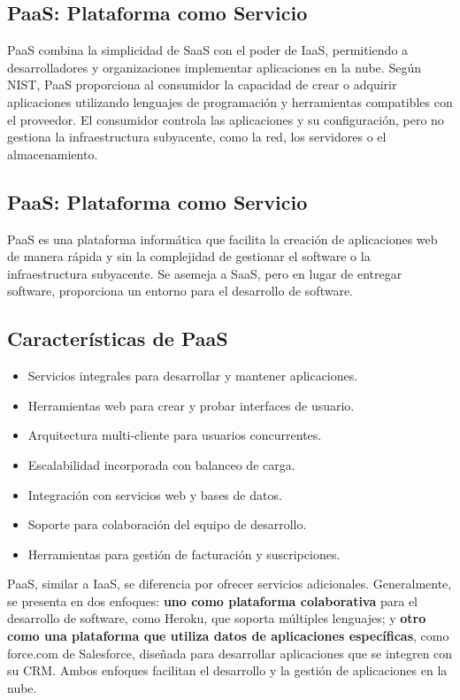 \documentclass{article}
\begin{document}
\subsection{PaaS: Plataforma como Servicio}

PaaS combina la simplicidad de SaaS con el poder de IaaS, permitiendo a desarrolladores y organizaciones implementar aplicaciones en la nube. Según NIST, PaaS proporciona al consumidor la capacidad de crear o adquirir aplicaciones utilizando lenguajes de programación y herramientas compatibles con el proveedor. El consumidor controla las aplicaciones y su configuración, pero no gestiona la infraestructura subyacente, como la red, los servidores o el almacenamiento.

\subsection{PaaS: Plataforma como Servicio}

PaaS es una plataforma informática que facilita la creación de aplicaciones web de manera rápida y sin la complejidad de gestionar el software o la infraestructura subyacente. Se asemeja a SaaS, pero en lugar de entregar software, proporciona un entorno para el desarrollo de software.

\subsection*{Características de PaaS}
\begin{itemize}
    \item Servicios integrales para desarrollar y mantener aplicaciones.
    \item Herramientas web para crear y probar interfaces de usuario.
    \item Arquitectura multi-cliente para usuarios concurrentes.
    \item Escalabilidad incorporada con balanceo de carga.
    \item Integración con servicios web y bases de datos.
    \item Soporte para colaboración del equipo de desarrollo.
    \item Herramientas para gestión de facturación y suscripciones.
\end{itemize}

PaaS, similar a IaaS, se diferencia por ofrecer servicios adicionales. Generalmente, se presenta en dos enfoques: \textbf{uno como plataforma colaborativa } para el desarrollo de software, como Heroku, que soporta múltiples lenguajes; y \textbf{otro como una plataforma que utiliza datos de aplicaciones específicas}, como force.com de Salesforce, diseñada para desarrollar aplicaciones que se integren con su CRM. Ambos enfoques facilitan el desarrollo y la gestión de aplicaciones en la nube.
\end{document}
